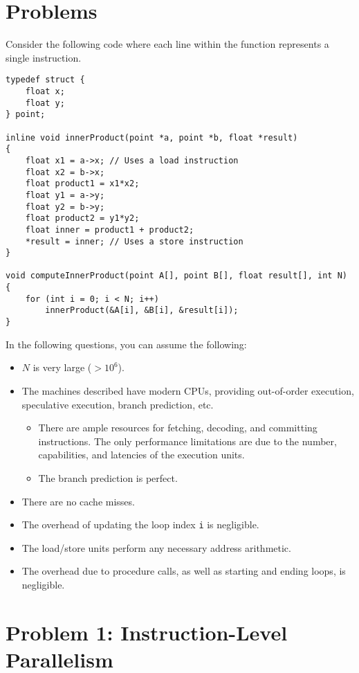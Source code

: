 \documentclass[11pt]{article}
\begin{document}
\newpage

\section*{Problems}

Consider the following code where each line within the function
represents a single instruction.
\begin{lstlisting}
typedef struct {
    float x;
    float y;
} point;

inline void innerProduct(point *a, point *b, float *result)
{
    float x1 = a->x; // Uses a load instruction
    float x2 = b->x;
    float product1 = x1*x2;
    float y1 = a->y;
    float y2 = b->y;
    float product2 = y1*y2;
    float inner = product1 + product2;
    *result = inner; // Uses a store instruction
}

void computeInnerProduct(point A[], point B[], float result[], int N)
{
    for (int i = 0; i < N; i++)
        innerProduct(&A[i], &B[i], &result[i]);
}
\end{lstlisting}

In the following questions,
you can assume the following:
\begin{itemize}
\item $N$ is very large ($> 10^6$).
\item The machines described have modern CPUs, providing
out-of-order execution, speculative execution, branch prediction, etc.
\begin{itemize}
\item There are ample resources for fetching, decoding, and committing instructions.  The only performance limitations are due to
the number, capabilities, and latencies of the execution units.
\item The branch prediction is perfect.
\end{itemize}
\item There are no cache misses.
\item The overhead of updating
the loop index {\tt i} is negligible.
\item The load/store units perform any necessary address arithmetic.
\item The overhead due to procedure calls, as well as starting and ending loops, is negligible.
\end{itemize}

\newpage

\section*{Problem 1: Instruction-Level Parallelism}
\end{document}
